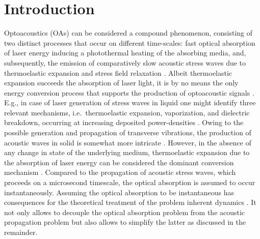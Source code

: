 \documentclass[5p,times,twocolumn]{elsarticle}
\begin{document}
\section{Introduction}

Optoacoustics (OAs) can be considered a compound phenomenon, consisting of two
distinct processes that occur on different time-scales: fast optical absorption
of laser energy inducing a photothermal heating of the absorbing media, and,
subsequently, the emission of comparatively slow acoustic stress waves due to
thermoelastic expansion and stress field relaxation
\cite{Sigrist:1978,Scruby:1980,Sigrist:1986,Tam:1986,Kruger:1995}.  Albeit
thermoelastic expansion succeeds the absorption of laser light, it is by no
means the only energy conversion process that supports the production of
optoacoustic signals \cite{Hutchins:1986,Tam:1986,Sigrist:1986}. E.g., in case
of laser generation of stress waves in liquid one might identify three relevant
mechanisms, i.e.\ thermoelastic expansion, vaporization, and dielectric
breakdown, occurring at increasing deposited power-densities
\cite{Hutchins:1986}.  Owing to the possible generation and propagation of
transverse vibrations, the production of acoustic waves in solid is somewhat
more intricate \cite{Scruby:1980}.  However, in the absence of any change in
state of the underlying medium, thermoelastic expansion due to the absorption
of laser energy can be considered the dominant conversion mechanism
\cite{Hutchins:1986,Tam:1986}.  Compared to the propagation of acoustic stress
waves, which proceeds on a microsecond timescale, the optical absorption is
assumed to occur instantaneously.  Assuming the optical absorption to be
instantaneous has consequences for the theoretical treatment of the problem
inherent dynamics \cite{Diebold:1990,Diebold:1991,Kruger:1995}. It not only
allows to decouple the optical absorption problem from the acoustic propagation
problem but also allows to simplify the latter as discussed in the remainder.
\end{document}
